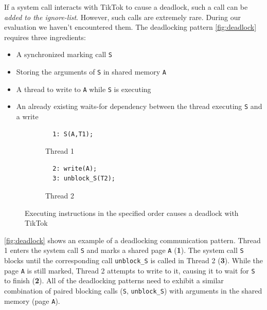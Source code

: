 \documentclass[conference]{IEEEtran}
\newcommand{\sysname}{TikTok}
\begin{document}
If a system call interacts with \sysname{} to cause a deadlock, such a call can
be \emph{added to the ignore-list}. However, such calls are extremely rare.
During our evaluation we haven't encountered them. The deadlocking pattern
\autoref{fig:deadlock} requires three ingredients:

\begin{itemize}
  \item A synchronized marking call \texttt{S}
  \item Storing the arguments of \texttt{S} in shared memory \texttt{A}
  \item A thread to write to \texttt{A} while \texttt{S} is executing
  \item An already existing waits-for dependency between the thread executing
  \texttt{S} and a write
\end{itemize}

\begin{figure}
  \centering
  \begin{subfigure}[b]{0.45\linewidth}
  \begin{minipage}{\linewidth}
  \begin{lstlisting}
  1: S(A,T1);  
  \end{lstlisting}
  \end{minipage}
  \caption{Thread 1}
  \end{subfigure}
  \hfill
  \begin{subfigure}[b]{0.45\linewidth}
  \begin{minipage}{\linewidth}
  \begin{lstlisting}
  2: write(A);
  3: unblock_S(T2);
  \end{lstlisting}  
  \end{minipage}
  \caption{Thread 2}
  \end{subfigure}
  \caption{Executing instructions in the specified order causes a deadlock with \sysname}
  \label{fig:deadlock}
\end{figure}

\autoref{fig:deadlock} shows an example of a deadlocking communication pattern.
Thread 1 enters the system call \texttt{S} and marks a shared page \texttt{A}
(\textbf{1}). The system call \texttt{S} blocks until the corresponding call
\texttt{unblock\_S} is called in Thread 2 (\textbf{3}). While the page
\texttt{A} is still marked, Thread 2 attempts to write to it, causing it to wait
for \texttt{S} to finish (\textbf{2}). All of the deadlocking patterns need to
exhibit a similar combination of paired blocking calls (\texttt{S},
\texttt{unblock\_S}) with arguments in the shared memory (page \texttt{A}).
\end{document}
